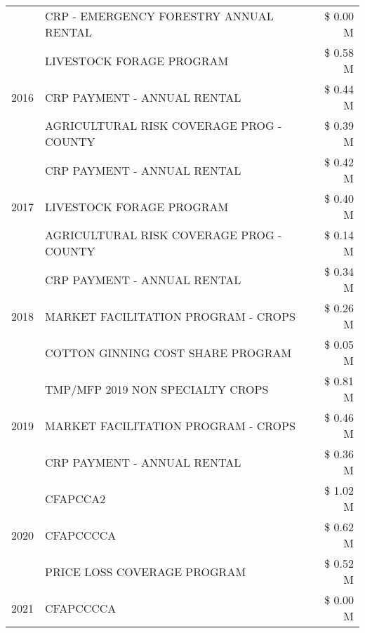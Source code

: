 \begin{tabular}{llr}
 & CRP - EMERGENCY FORESTRY ANNUAL RENTAL & \$ 0.00 M \\
\cline{1-3}
\multirow[t]{3}{*}{2016} & LIVESTOCK FORAGE PROGRAM & \$ 0.58 M \\
 & CRP PAYMENT - ANNUAL RENTAL & \$ 0.44 M \\
 & AGRICULTURAL RISK COVERAGE PROG - COUNTY & \$ 0.39 M \\
\cline{1-3}
\multirow[t]{3}{*}{2017} & CRP PAYMENT - ANNUAL RENTAL & \$ 0.42 M \\
 & LIVESTOCK FORAGE PROGRAM & \$ 0.40 M \\
 & AGRICULTURAL RISK COVERAGE PROG - COUNTY & \$ 0.14 M \\
\cline{1-3}
\multirow[t]{3}{*}{2018} & CRP PAYMENT - ANNUAL RENTAL & \$ 0.34 M \\
 & MARKET FACILITATION PROGRAM - CROPS & \$ 0.26 M \\
 & COTTON GINNING COST SHARE PROGRAM & \$ 0.05 M \\
\cline{1-3}
\multirow[t]{3}{*}{2019} & TMP/MFP 2019 NON SPECIALTY CROPS & \$ 0.81 M \\
 & MARKET FACILITATION PROGRAM - CROPS & \$ 0.46 M \\
 & CRP PAYMENT - ANNUAL RENTAL & \$ 0.36 M \\
\cline{1-3}
\multirow[t]{3}{*}{2020} & CFAPCCA2 & \$ 1.02 M \\
 & CFAPCCCCA & \$ 0.62 M \\
 & PRICE LOSS COVERAGE PROGRAM & \$ 0.52 M \\
\cline{1-3}
2021 & CFAPCCCCA & \$ 0.00 M \\
\cline{1-3}
\bottomrule
\end{tabular}
